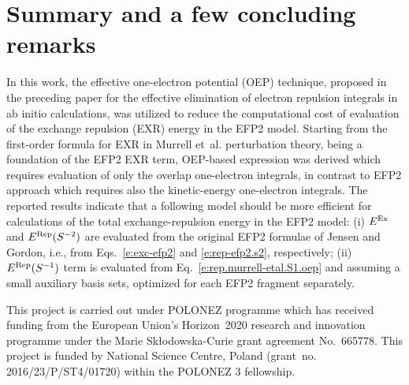 
\section{\label{s:6.conclusions}Summary and a few concluding remarks}

In this work, the effective one-electron potential (OEP) technique,
proposed in the preceding paper for the
effective elimination of electron
repulsion integrals in ab initio calculations,
was utilized to reduce the computational cost
of evaluation of the exchange repulsion (EXR) energy in the EFP2 model.
Starting from the first-order formula for EXR in Murrell et~al. perturbation theory, 
being a foundation of the EFP2 EXR term,
OEP\hyp{}based expression was derived which requires evaluation of
only the overlap one-electron integrals, in contrast to EFP2
approach which requires also the kinetic-energy one-electron
integrals. 
The reported results indicate that a following model should be more
efficient for calculations of the 
total exchange\hyp{}repulsion energy in the EFP2 model: 
(i) $E^{\rm Ex}$ and $E^{\rm Rep}(S^{-2})$ are evaluated
from the original EFP2 formulae of Jensen and Gordon, i.e.,
from Eqs.~\eqref{e:exc-efp2} and \eqref{e:rep-efp2.s2}, respectively;
(ii) $E^{\rm Rep}(S^{-1})$ term is evaluated from Eq.~\eqref{e:rep.murrell-etal.S1.oep}
and assuming a small auxiliary basis sets, optimized for each
EFP2 fragment separately.


\begin{acknowledgments}
This project is carried out under POLONEZ programme which has received funding from the European Union's
Horizon~2020 research and innovation programme under the Marie Sk{\l}odowska-Curie grant agreement 
No.~665778. This project is funded by National Science Centre, Poland 
(grant~no. 2016/23/P/ST4/01720) within the POLONEZ 3 fellowship.
\end{acknowledgments}






